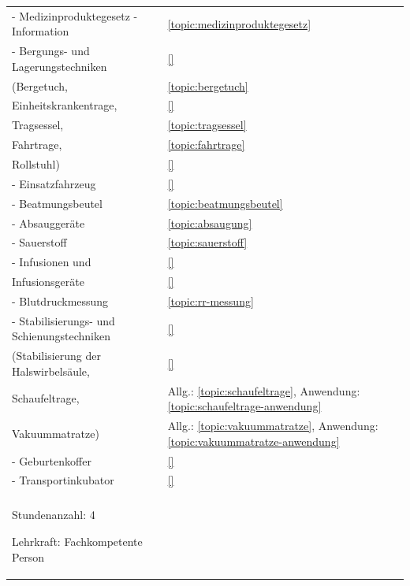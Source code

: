 \begin{xtabular}{p{10cm}p{5cm}}
\\\midrule

- Medizinproduktegesetz - Information    
& 
\ref{topic:medizinproduktegesetz}
\\
- Bergungs- und Lagerungstechniken     
& 
\ref{}\noindent{}
\\
(Bergetuch,
& 
\ref{topic:bergetuch}
\\
Einheitskrankentrage,
& 
\ref{}\noindent{}
\\
Tragsessel, 
& 
\ref{topic:tragsessel}
\\
Fahrtrage,
& 
\ref{topic:fahrtrage}
\\
Rollstuhl)
& 
\ref{}\noindent{}
\\
- Einsatzfahrzeug
& 
\ref{}\noindent{}
\\
- Beatmungsbeutel
& 
\ref{topic:beatmungsbeutel}
\\
- Absauggeräte
& 
\ref{topic:absaugung}
\\
- Sauerstoff
& 
\ref{topic:sauerstoff}
\\
- Infusionen und
& 
\ref{}\noindent{}
\\
Infusionsgeräte
& 
\ref{}\noindent{}
\\
- Blutdruckmessung
& 
\ref{topic:rr-messung}
\\
- Stabilisierungs- und Schienungstechniken
& 
\ref{}\noindent{}
\\
(Stabilisierung der Halswirbelsäule,
& 
\ref{}\noindent{}
\\
Schaufeltrage,
& 
Allg.: \ref{topic:schaufeltrage}, Anwendung:
\ref{topic:schaufeltrage-anwendung}
\\
Vakuummatratze)
& 
Allg.: \ref{topic:vakuummatratze}, Anwendung:
\ref{topic:vakuummatratze-anwendung}
\\
- Geburtenkoffer
& 
\ref{}\noindent{}
\\
- Transportinkubator
& 
\ref{}\noindent{}
\\
 \\\toprule
{}  



\begin{inparadesc}
\item[Stundenanzahl:]  4  
\item[Lehrkraft:]   Fachkompetente Person
\end{inparadesc}

\\\midrule


\end{xtabular}
